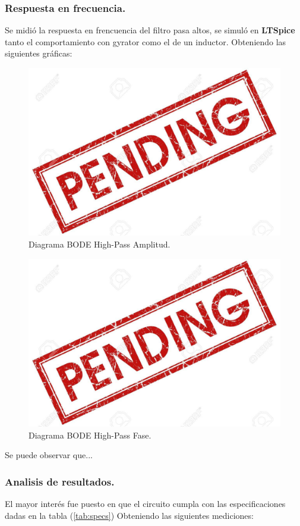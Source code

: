 \documentclass[a4paper]{article}
\begin{document}
\subsubsection{Respuesta en frecuencia.}
Se midió la respuesta en frencuencia del filtro pasa altos, se simuló en \textbf{LTSpice}  tanto el comportamiento con gyrator como el de un inductor. Obteniendo las siguientes gráficas:
\begin{figure}[H]	
	\centering
	\includegraphics[width=\textwidth]{ImagenesEj2/bodehp.jpg}
	\caption{Diagrama BODE High-Pass Amplitud.}
	\label{fig:bodehp}
\end{figure}
\begin{figure}[H]	
	\centering
	\includegraphics[width=\textwidth]{ImagenesEj2/bodehpp.jpg}
	\caption{Diagrama BODE High-Pass Fase.}
	\label{fig:bodehpp}
\end{figure}
Se puede observar que...
\subsubsection{Analisis de resultados.}
El mayor interés fue puesto en que el circuito cumpla con las especificaciones dadas en la tabla (\ref{tab:specs})
Obteniendo las siguientes mediciones:
\end{document}

